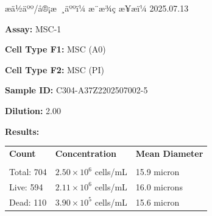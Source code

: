 \documentclass[UTF8,10pt,a4paper,fontset=fandol]{ctexart}
\newcommand{\fieldvalue}[1]{#1}
\newcommand{\handwritten}[1]{#1}
\begin{document}
\vfill

\noindent
æä½äºº/å®¡æ ¸äººï¼
\fieldvalue{\handwritten{æ¨æ¾ç}}
\hfill
æ¥æï¼
\fieldvalue{\handwritten{2025.07.13}}

\newpage

\noindent
\textbf{Assay:}
\fieldvalue{MSC-1}

\noindent
\textbf{Cell Type F1:}
\fieldvalue{MSC (A0)}

\noindent
\textbf{Cell Type F2:}
\fieldvalue{MSC (PI)}

\medskip
\noindent
\textbf{Sample ID:}
\fieldvalue{C304-A37Z2202507002-5}

\noindent
\textbf{Dilution:}
\fieldvalue{2.00}

\medskip
\noindent
\textbf{Results:}

\medskip
\noindent
\begin{tabularx}{\textwidth}{@{}X X X@{}}
\textbf{Count} & \textbf{Concentration} & \textbf{Mean Diameter} \\
\underline{\hspace{1.8cm}} & \underline{\hspace{2.3cm}} & \underline{\hspace{2.3cm}} \\[2pt]

Total:
\fieldvalue{704}
&
\fieldvalue{$2.50\times 10^6$ cells/mL}
&
\fieldvalue{15.9 micron}
\\

Live:
\fieldvalue{594}
&
\fieldvalue{$2.11\times 10^6$ cells/mL}
&
\fieldvalue{16.0 microns}
\\

Dead:
\fieldvalue{110}
&
\fieldvalue{$3.90\times 10^5$ cells/mL}
&
\fieldvalue{15.6 micron}
\end{tabularx}
\end{document}
